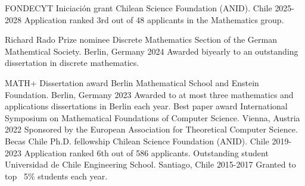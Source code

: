 
\begin{cvhonors}



\cvhonor
{FONDECYT Iniciación grant} %
{Chilean Science Foundation (ANID).} %
{Chile} %
{2025-2028} %
{Application ranked 3rd out of 48 applicants in the Mathematics group.} %

 \cvhonor
 {Richard Rado Prize nominee} %
 {Discrete Mathematics Section of the German Mathemtical Society.} %
 {Berlin, Germany} %
 {2024} %
 {Awarded biyearly to an outstanding dissertation in discrete mathematics.} %
%  


 \cvhonor
 {MATH+ Dissertation award} %
 {Berlin Mathematical School and Enstein Foundation.} %
 {Berlin, Germany} %
 {2023} %
 {Awarded to at most three mathematics and applications dissertations in Berlin each year.} %
%  
  \cvhonor
    {Best paper award} %
    {International Symposium on Mathematical Foundations of Computer Science.} %
    {Vienna, Austria} %
    {2022} %
    {Sponsored by the European Association for Theoretical Computer Science.} %
  \cvhonor
    {Becas Chile Ph.D. fellowship} %
    {Chilean Science Foundation (ANID).} %
    {Chile} %
    {2019-2023} %
    {Application ranked 6th out of 586 applicants.} %
  \cvhonor
    {Outstanding student} %
    {Universidad de Chile Engineering School.} %
    {Santiago, Chile} %
    {2015-2017} %
    {Granted to top ~5\% students each year.} %
\end{cvhonors}

